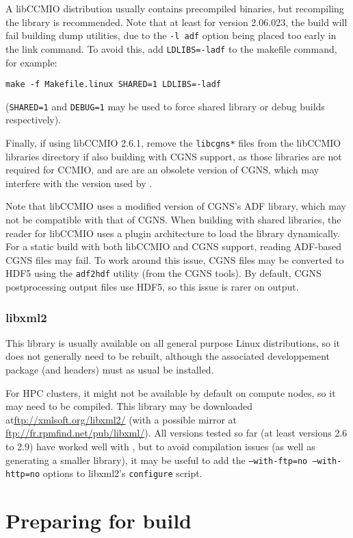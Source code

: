 \documentclass[a4paper,10pt,twoside]{csshortdoc}
\begin{document}
A libCCMIO distribution usually contains precompiled
binaries, but recompiling the library is recommended.
Note that at least for version 2.06.023, the build will fail
building dump utilities, due to the \texttt{-l adf} option
being placed too early in the link command. To avoid this,
add \texttt{LDLIBS=-ladf} to the makefile command, for example:

\texttt{make -f Makefile.linux SHARED=1 LDLIBS=-ladf}

(\texttt{SHARED=1} and \texttt{DEBUG=1} may be used to force
shared library or debug builds respectively).

Finally, if using libCCMIO 2.6.1, remove the \texttt{libcgns*}
files from the libCCMIO libraries directory if also building
\CS with CGNS support, as those libraries are not required
for CCMIO, and are are an obsolete version of CGNS, which
may interfere with the version used by \CS.

Note that libCCMIO uses a modified version of CGNS's ADF library,
which may not be compatible with that of CGNS. When building
with shared libraries, the reader for libCCMIO uses a plugin
architecture to load the library dynamically. For a static
build with both libCCMIO and CGNS support, reading ADF-based
CGNS files may fail. To work around this issue, CGNS files
may be converted to HDF5 using the \texttt{adf2hdf} utility
(from the CGNS tools). By default, CGNS postprocessing output
files use HDF5, so this issue is rarer on output.

\subsubsection{libxml2\label{sec:ext:libxml2}}

This library is usually available on all general purpose Linux
distributions, so it does not generally need to be rebuilt,
although the associated developpement package (and headers) must
as usual be installed.

For HPC clusters, it might not be available by default on compute nodes,
so it may need to be compiled. This library may be downloaded
at\url{ftp://xmlsoft.org/libxml2/} (with a possible mirror at
\url{ftp://fr.rpmfind.net/pub/libxml/}). All versions tested so far
(at least versions 2.6 to 2.9) have worked well with \CS, but to avoid
compilation issues (as well as generating a smaller library), it
may be useful to add the \texttt{--with-ftp=no --with-http=no} options
to libxml2's \texttt{configure} script.

\section{Preparing for build\label{sec:prepare}}
\end{document}
